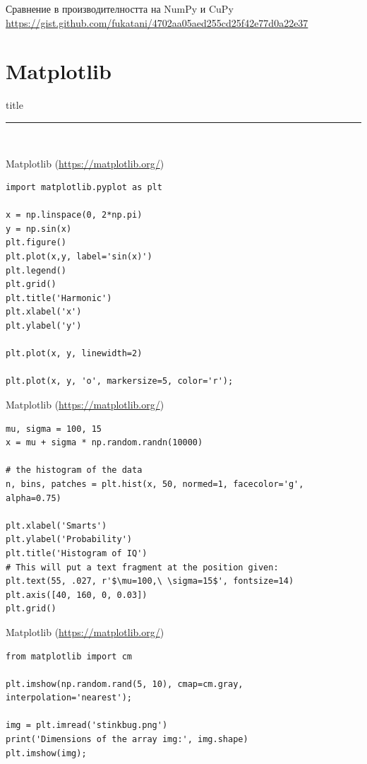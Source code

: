 \documentclass{beamer}
\begin{document}
\begin{frame}{Сравнение в производителността на NumPy и CuPy}
  \url{https://gist.github.com/fukatani/4702aa05aed255cd25f42e77d0a22e37}
\end{frame}


\section{Matplotlib }
\begin{frame}[plain]
  \vfill
  \centering
  \begin{beamercolorbox}[sep=8pt,center,shadow=true,rounded=true]{title}
    \par%
    \color{oxfordblue}\noindent\rule{10cm}{1pt} \\
  \end{beamercolorbox}
  \vfill
\end{frame}

\begin{frame}[fragile]{Matplotlib (\url{https://matplotlib.org/})}
\begin{lstlisting}
import matplotlib.pyplot as plt

x = np.linspace(0, 2*np.pi)
y = np.sin(x)
plt.figure()
plt.plot(x,y, label='sin(x)')
plt.legend()
plt.grid()
plt.title('Harmonic')
plt.xlabel('x')
plt.ylabel('y')

plt.plot(x, y, linewidth=2)

plt.plot(x, y, 'o', markersize=5, color='r');
\end{lstlisting}
\end{frame}

\begin{frame}[fragile]{Matplotlib (\url{https://matplotlib.org/})}
\begin{lstlisting}
mu, sigma = 100, 15
x = mu + sigma * np.random.randn(10000)

# the histogram of the data
n, bins, patches = plt.hist(x, 50, normed=1, facecolor='g', alpha=0.75)

plt.xlabel('Smarts')
plt.ylabel('Probability')
plt.title('Histogram of IQ')
# This will put a text fragment at the position given:
plt.text(55, .027, r'$\mu=100,\ \sigma=15$', fontsize=14)
plt.axis([40, 160, 0, 0.03])
plt.grid()
\end{lstlisting}
\end{frame}

\begin{frame}[fragile]{Matplotlib (\url{https://matplotlib.org/})}
\begin{lstlisting}
from matplotlib import cm

plt.imshow(np.random.rand(5, 10), cmap=cm.gray, interpolation='nearest');

img = plt.imread('stinkbug.png')
print('Dimensions of the array img:', img.shape)
plt.imshow(img);
\end{lstlisting}
\end{frame}
\end{document}

